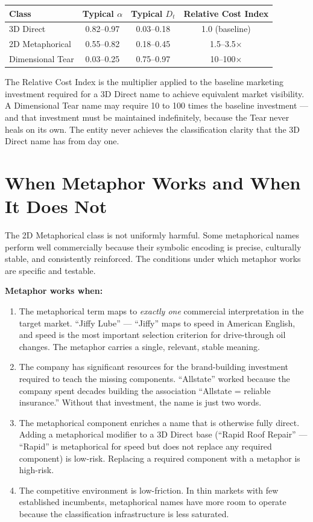 \documentclass[12pt, openany]{book}
\theoremstyle{thmstyle}
\theoremstyle{defstyle}
\begin{document}
\begin{center}
\begin{tabular}{lccc}
\toprule
\textbf{Class} & \textbf{Typical $\alpha$} & \textbf{Typical $D_t$} & \textbf{Relative Cost Index} \\
\midrule
3D Direct & 0.82--0.97 & 0.03--0.18 & 1.0 (baseline) \\
2D Metaphorical & 0.55--0.82 & 0.18--0.45 & 1.5--3.5$\times$ \\
Dimensional Tear & 0.03--0.25 & 0.75--0.97 & 10--100$\times$ \\
\bottomrule
\end{tabular}
\end{center}

The Relative Cost Index is the multiplier applied to the baseline marketing investment required for a 3D Direct name to achieve equivalent market visibility. A Dimensional Tear name may require 10 to 100 times the baseline investment --- and that investment must be maintained indefinitely, because the Tear never heals on its own. The entity never achieves the classification clarity that the 3D Direct name has from day one.

\section{When Metaphor Works and When It Does Not}

The 2D Metaphorical class is not uniformly harmful. Some metaphorical names perform well commercially because their symbolic encoding is precise, culturally stable, and consistently reinforced. The conditions under which metaphor works are specific and testable.

\textbf{Metaphor works when:}
\begin{enumerate}[leftmargin=1.5em]
  \item The metaphorical term maps to \textit{exactly one} commercial interpretation in the target market. ``Jiffy Lube'' --- ``Jiffy'' maps to speed in American English, and speed is the most important selection criterion for drive-through oil changes. The metaphor carries a single, relevant, stable meaning.
  \item The company has significant resources for the brand-building investment required to teach the missing components. ``Allstate'' worked because the company spent decades building the association ``Allstate = reliable insurance.'' Without that investment, the name is just two words.
  \item The metaphorical component enriches a name that is otherwise fully direct. Adding a metaphorical modifier to a 3D Direct base (``Rapid Roof Repair'' --- ``Rapid'' is metaphorical for speed but does not replace any required component) is low-risk. Replacing a required component with a metaphor is high-risk.
  \item The competitive environment is low-friction. In thin markets with few established incumbents, metaphorical names have more room to operate because the classification infrastructure is less saturated.
\end{enumerate}
\end{document}
